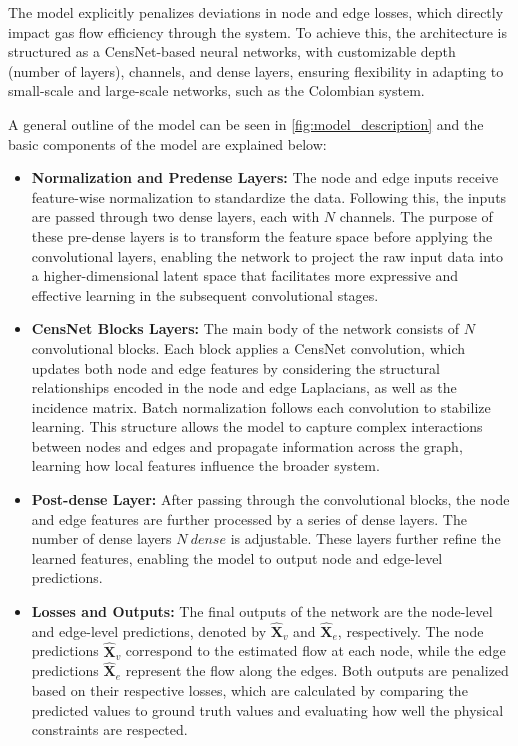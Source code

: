 The model explicitly penalizes deviations in node and edge losses, which directly impact gas flow efficiency through the system. To achieve this, the architecture is structured as a CensNet-based neural networks, with customizable depth (number of layers), channels, and dense layers, ensuring flexibility in adapting to small-scale and large-scale networks, such as the Colombian system.

A general outline of the model can be seen in \cref{fig:model_description} and the basic components of the model are explained below:

\begin{itemize}
        
    \item \textbf{Normalization and Pre\-dense Layers:} The node and edge inputs receive feature-wise normalization to standardize the data. Following this, the inputs are passed through two dense layers, each with $N$ channels. The purpose of these pre-dense layers is to transform the feature space before applying the convolutional layers, enabling the network to project the raw input data into a higher-dimensional latent space that facilitates more expressive and effective learning in the subsequent convolutional stages.


    \item \textbf{CensNet Blocks Layers:} The main body of the network consists of \(N\) convolutional blocks. Each block applies a CensNet convolution, which updates both node and edge features by considering the structural relationships encoded in the node and edge Laplacians, as well as the incidence matrix. Batch normalization follows each convolution to stabilize learning. This structure allows the model to capture complex interactions between nodes and edges and propagate information across the graph, learning how local features influence the broader system.
   
    \item \textbf{Post-dense Layer:} After passing through the convolutional blocks, the node and edge features are further processed by a series of dense layers. The number of dense layers $N \ dense$ is adjustable. These layers further refine the learned features, enabling the model to output node and edge-level predictions. 
   
    
    \item \textbf{Losses and Outputs:} The final outputs of the network are the node-level and edge-level predictions, denoted by \(\hat{\mathbf{X}}_v\) and \(\hat{\mathbf{X}}_e\), respectively. The node predictions \(\hat{\mathbf{X}}_v\) correspond to the estimated flow at each node, while the edge predictions \(\hat{\mathbf{X}}_e\) represent the flow along the edges. Both outputs are penalized based on their respective losses, which are calculated by comparing the predicted values to ground truth values and evaluating how well the physical constraints are respected.



\end{itemize}

